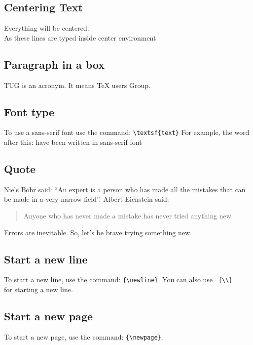 \subsection{Centering Text}
\begin{center}
Everything will be centered. \\
As these lines are typed inside center environment
\end{center}

\subsection{Paragraph in a box}
\parbox{2.5cm}{TUG is an acronym. It means \TeX{} users Group.}


\subsection{Font type}
To use a sans-serif font use the command: \verb+\textsf{text}+
For example, the word after this: \textsf{have been written in sans-serif font}

\subsection{Quote}
Niels Bohr said: ``An expert is a person who has made all the mistakes that can be made in a very narrow field''.
Albert Eienstein said:
\begin{quote}
Anyone who has never made a mistake has never tried anything new
\end{quote}
Errors are inevitable. So, let's be brave trying something new.



\subsection{Start a new line}
To start a new line, \newline use the command: \verb+{\newline}+. You can also use \verb+ {\\}+
\\ for starting a new line.

\subsection{Start a new page}
To start a new page, \newpage use the command: \verb+{\newpage}+.